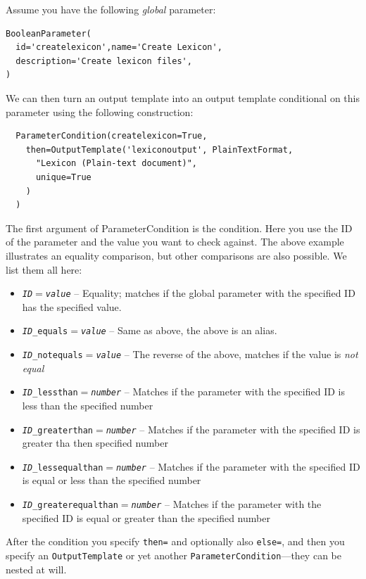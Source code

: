 \documentclass[a4paper,12pt,twoside,openright]{report}
\begin{document}
Assume you have the following \emph{global} parameter:

{ \small
\begin{verbatim}
BooleanParameter(
  id='createlexicon',name='Create Lexicon',
  description='Create lexicon files', 
)
\end{verbatim}
}

We can then turn an output template into an output template conditional on this parameter using the following construction:

{ \small
\begin{verbatim}
  ParameterCondition(createlexicon=True, 
    then=OutputTemplate('lexiconoutput', PlainTextFormat,
      "Lexicon (Plain-text document)",  
      unique=True
    ) 
  )
\end{verbatim}
}

The first argument of ParameterCondition is the condition. Here you use the ID
of the parameter and the value you want to check against. The above example
illustrates an equality comparison, but other comparisons are also possible. We
list them all here:

\begin{itemize}
\item \texttt{\emph{ID}$=$\emph{value}} -- Equality; matches if the global parameter with the specified ID has the specified value.
\item \texttt{\emph{ID}\_equals$=$\emph{value}} -- Same as above, the above is an alias.
\item \texttt{\emph{ID}\_notequals$=$\emph{value}} -- The reverse of the above, matches if the value is \emph{not equal}
\item \texttt{\emph{ID}\_lessthan$=$\emph{number}} -- Matches if the parameter with the specified ID is less than the specified number
\item \texttt{\emph{ID}\_greaterthan$=$\emph{number}} -- Matches if the parameter with the specified ID is greater tha then specified number
\item \texttt{\emph{ID}\_lessequalthan$=$\emph{number}} -- Matches if the parameter with the specified ID is equal or less than the specified number
\item \texttt{\emph{ID}\_greaterequalthan$=$\emph{number}} -- Matches if the parameter with the specified ID is equal or greater than the specified number
\end{itemize}

After the condition you specify \texttt{then=} and optionally also
\texttt{else=}, and then you specify an \texttt{OutputTemplate} or yet another
\texttt{ParameterCondition}---they can be nested at will.
\end{document}
